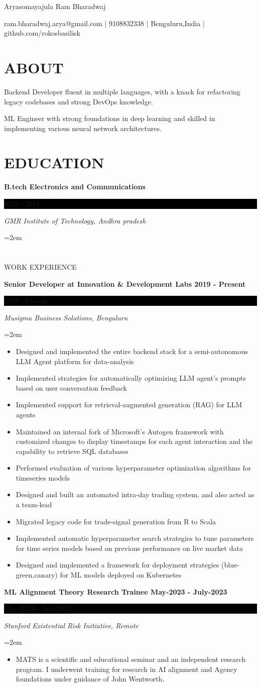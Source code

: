 \documentclass[fontsize=11pt]{article}
\newcommand{\sepspace}{\vspace*{1em}}   %
\newcommand{\MyName}[1]{ %
    \Huge \usefont{OT1}{phv}{b}{n} \hfill #1
    \par \normalsize \normalfont}
\newcommand{\NewPart}[1]{\section*{\uppercase{#1}}}
\newcommand{\EducationEntry}[4]{
    \noindent \textbf{#1} \hfill      %
    \colorbox{Black}{
      \parbox{8.5em}{
      \hfill\color{White}#2}} \par  %
    \noindent \textit{#3} \par        %
    \noindent\hangindent=2em\hangafter=0 \small #4 %
    \normalsize \par}
\newcommand{\WorkEntry}[4]{       %
    \noindent \textbf{#1} \hfill      %
    \colorbox{Black}{%
      \parbox{9em}{%
      \hfill\color{White}#2}} \par   %
        \noindent \textit{#3} \par        %
    \noindent\hangindent=2em\hangafter=0 \small #4 %
    \normalsize \par}
\newcommand{\AboutEntry}[1]{
    \noindent #1 \par}
\begin{document}
\MyName{Aryasomayajula Ram Bharadwaj}
\bigskip

{\small \hfill ram.bharadwaj.arya@gmail.com | 9108832338 | Benguluru,India | github.com/rokosbasilisk}

\NewPart{ABOUT}{}
\AboutEntry{Backend Developer fluent in multiple languages, with a knack for refactoring legacy codebases and strong DevOps knowledge.}
\AboutEntry{ML Engineer with strong foundations in deep learning and skilled in implementing various neural network architectures.}

\NewPart{EDUCATION}{}
\EducationEntry
{B.tech Electronics and Communications}
{2015 - 2019}
{GMR Institute of Technology, Andhra pradesh}

\NewPart{WORK EXPERIENCE}{}

\WorkEntry
{Senior Developer at Innovation \& Development Labs 2019 - Present}
{2019 - Present}
{Musigma Business Solutions, Benguluru}
{\begin{itemize} \itemsep -1pt
	\item Designed and implemented the entire backend stack for a semi-autonomous LLM Agent platform for data-analysis
	\item Implemented strategies for automatically optimizing LLM agent's prompts based on user conversation feedback
	\item Implemented support for retrieval-augmented generation (RAG) for LLM agents
	\item Maintained an internal fork of Microsoft's Autogen framework with customized changes to display timestamps for each agent interaction and the capability to retrieve SQL databases
	\item Performed evaluation of various hyperparameter optimization algorithms for timeseries models
	\item Designed and built an automated intra-day trading system, and also acted as a team-lead
	\item Migrated legacy code for trade-signal generation from R to Scala
	\item Implemented automatic hyperparameter search strategies to tune parameters for time series models based on previous performance on live market data
	\item Designed and implemented a framework for deployment strategies (blue-green,canary) for ML models deployed on Kubernetes
	\end{itemize}}
\sepspace
\WorkEntry
{ML Alignment Theory Research Trainee May-2023 - July-2023}
{May-2023 - July-2023}
{Stanford Existential Risk Initiative, Remote}
{\begin{itemize} \itemsep -1pt
	\item MATS is a scientific and educational seminar and an independent research program. I underwent training for research in AI alignment and Agency foundations under guidance of John Wentworth.
	\end{itemize}}
\end{document}
